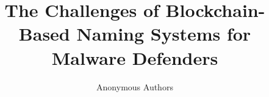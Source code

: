 \documentclass[conference]{IEEEtran}
\begin{document}
\author{Anonymous Authors}

\title{The Challenges of Blockchain-Based Naming Systems for Malware Defenders}



\maketitle
\pagestyle{plain}
\end{document}
